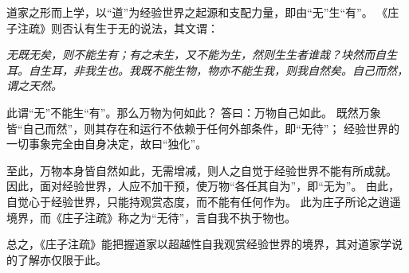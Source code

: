 \documentclass[11pt]{article}
\begin{document}
道家之形而上学，以“道”为经验世界之起源和支配力量，即由“无”生“有”。
《庄子注疏》则否认有生于无的说法，其文谓：

\textit{无既无矣，则不能生有；有之未生，又不能为生，然则生生者谁哉？块然而自生耳。自生耳，非我生也。我既不能生物，物亦不能生我，则我自然矣。自己而然，谓之天然。}

此谓“无”不能生“有”。那么万物为何如此？
答曰：万物自己如此。
既然万象皆“自己而然”，则其存在和运行不依赖于任何外部条件，即“无待”；
经验世界的一切事象完全由自身决定，故曰“独化”。

\par

至此，万物本身皆自然如此，无需增减，则人之自觉于经验世界不能有所成就。
因此，面对经验世界，人应不加干预，使万物“各任其自为”，即“无为”。
由此，自觉心于经验世界，只能持观赏态度，而不能有任何作为。
此为庄子所论之逍遥境界，而《庄子注疏》称之为“无待”，言自我不执于物也。

\par

总之，《庄子注疏》能把握道家以超越性自我观赏经验世界的境界，其对道家学说的了解亦仅限于此。  
  
\end{document}
